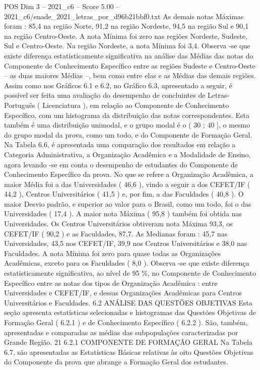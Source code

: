 \begin{textsample}{POS Dim 3 – 2021\_c6 – Score 5.00 – 2021\_c6/enade\_2021\_letras\_por\_d96b21bbf0.txt}
As demais notas Máximas foram : 85,4 na região Norte, 91,2 na região Nordeste, 94,5 na região Sul e 90,1 na região Centro-Oeste.
A nota Mínima foi zero nas regiões Nordeste, Sudeste, Sul e Centro-Oeste.
Na região Nordeste, a nota Mínima foi 3,4.
Observa -se que existe diferença estatisticamente significativa na análise das Médias das notas do Componente de Conhecimento Específico entre as regiões Sudeste e Centro-Oeste – as duas maiores Médias –, bem como entre elas e as Médias das demais regiões.
Assim como nos Gráficos 6.1 e 6.2, no Gráfico 6.3, apresentado a seguir, é possível ser feita uma avaliação do desempenho de concluintes de Letras-Português ( Licenciatura ), em relação ao Componente de Conhecimento Específico, com um histograma da distribuição das notas correspondentes.
Esta também é uma distribuição unimodal, e o grupo modal é o ( 30 ; 40 ], o mesmo do grupo modal da prova, como um todo, e do Componente de Formação Geral.
Na Tabela 6.6, é apresentada uma comparação dos resultados em relação a Categoria Administrativa, a Organização Acadêmica e a Modalidade de Ensino, agora levando -se em conta o desempenho de estudantes do Componente de Conhecimento Específico da prova.
No que se refere a Organização Acadêmica, a maior Média foi a das Universidades ( 46,6 ), vindo a seguir a dos CEFET/IF ( 44,2 ), Centros Universitários ( 41,5 ) e, por fim, a das Faculdades ( 40,8 ).
O maior Desvio padrão, e superior ao valor para o Brasil, como um todo, foi o das Universidades ( 17,4 ).
A maior nota Máxima ( 95,8 ) também foi obtida nas Universidades.
Os Centros Universitários obtiveram nota Máxima 93,3, os CEFET/IF ( 90,2 ) e as Faculdades, 87,7.
As Medianas foram : 45,7 nas Universidades, 43,5 nos CEFET/IF, 39,9 nos Centros Universitários e 38,0 nas Faculdades.
A nota Mínima foi zero para quase todas as Organizações Acadêmicas, exceto para os Faculdades ( 8,0 ).
Observa -se que existe diferença estatisticamente significativa, ao nível de 95 \%, no Componente de Conhecimento Específico entre as notas dos tipos de Organização Acadêmica : entre Universidades e CEFET/IF, e dessas Organizações Acadêmicas para Centros Universitários e Faculdades. 6.2 ANÁLISE DAS QUESTÕES OBJETIVAS Esta seção apresenta estatísticas selecionadas e histogramas das Questões Objetivas de Formação Geral ( 6.2.1 ) e de Conhecimento Específico ( 6.2.2 ).
São, também, apresentadas e comparadas as médias das subpopulações caracterizadas por Grande Região. 21 6.2.1 COMPONENTE DE FORMAÇÃO GERAL Na Tabela 6.7, são apresentadas as Estatísticas Básicas relativas às oito Questões Objetivas do Componente da prova que abrange a Formação Geral dos estudantes.

\end{textsample}
